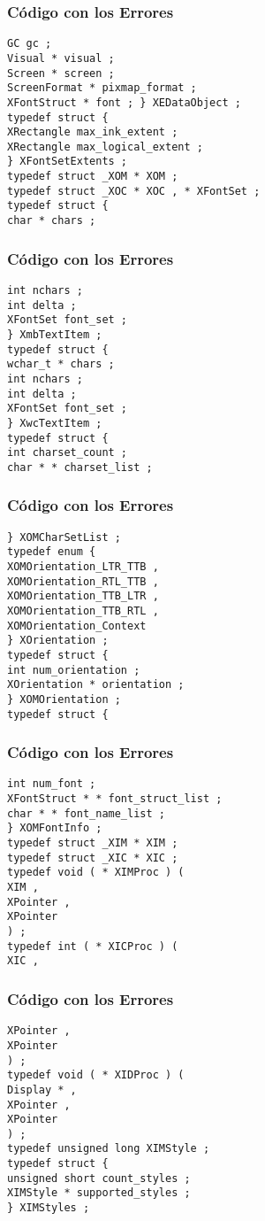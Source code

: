 \documentclass{beamer}
\begin{document}
\begin{frame}[fragile]
\frametitle{C\'odigo con los Errores}
\begin{verbatim}
GC gc ; 
Visual * visual ; 
Screen * screen ; 
ScreenFormat * pixmap_format ; 
XFontStruct * font ; } XEDataObject ; 
typedef struct { 
XRectangle max_ink_extent ; 
XRectangle max_logical_extent ; 
} XFontSetExtents ; 
typedef struct _XOM * XOM ; 
typedef struct _XOC * XOC , * XFontSet ; 
typedef struct { 
char * chars ; 
\end{verbatim}
\end{frame}
\begin{frame}[fragile]
\frametitle{C\'odigo con los Errores}
\begin{verbatim}
int nchars ; 
int delta ; 
XFontSet font_set ; 
} XmbTextItem ; 
typedef struct { 
wchar_t * chars ; 
int nchars ; 
int delta ; 
XFontSet font_set ; 
} XwcTextItem ; 
typedef struct { 
int charset_count ; 
char * * charset_list ; 
\end{verbatim}
\end{frame}
\begin{frame}[fragile]
\frametitle{C\'odigo con los Errores}
\begin{verbatim}
} XOMCharSetList ; 
typedef enum { 
XOMOrientation_LTR_TTB , 
XOMOrientation_RTL_TTB , 
XOMOrientation_TTB_LTR , 
XOMOrientation_TTB_RTL , 
XOMOrientation_Context 
} XOrientation ; 
typedef struct { 
int num_orientation ; 
XOrientation * orientation ; 
} XOMOrientation ; 
typedef struct { 
\end{verbatim}
\end{frame}
\begin{frame}[fragile]
\frametitle{C\'odigo con los Errores}
\begin{verbatim}
int num_font ; 
XFontStruct * * font_struct_list ; 
char * * font_name_list ; 
} XOMFontInfo ; 
typedef struct _XIM * XIM ; 
typedef struct _XIC * XIC ; 
typedef void ( * XIMProc ) ( 
XIM , 
XPointer , 
XPointer 
) ; 
typedef int ( * XICProc ) ( 
XIC , 
\end{verbatim}
\end{frame}
\begin{frame}[fragile]
\frametitle{C\'odigo con los Errores}
\begin{verbatim}
XPointer , 
XPointer 
) ; 
typedef void ( * XIDProc ) ( 
Display * , 
XPointer , 
XPointer 
) ; 
typedef unsigned long XIMStyle ; 
typedef struct { 
unsigned short count_styles ; 
XIMStyle * supported_styles ; 
} XIMStyles ; 
\end{verbatim}
\end{frame}
\end{document}
